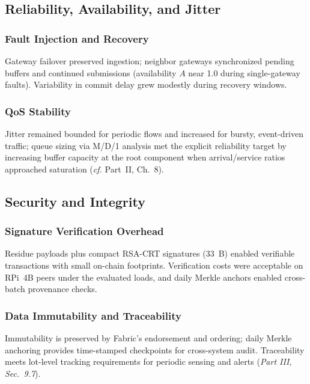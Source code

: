 \subsection{Reliability, Availability, and Jitter}

\subsubsection{Fault Injection and Recovery}
Gateway failover preserved ingestion; neighbor gateways synchronized pending buffers and continued submissions (availability $A$ near 1.0 during single-gateway faults). Variability in commit delay grew modestly during recovery windows. %

\subsubsection{QoS Stability}
Jitter remained bounded for periodic flows and increased for bursty, event-driven traffic; queue sizing via M/D/1 analysis met the explicit reliability target by increasing buffer capacity at the root component when arrival/service ratios approached saturation (\emph{cf.} Part~II, Ch.~8). %

\subsection{Security and Integrity}

\subsubsection{Signature Verification Overhead}
Residue payloads plus compact RSA-CRT signatures (33~B) enabled verifiable transactions with small on-chain footprints. Verification costs were acceptable on RPi~4B peers under the evaluated loads, and daily Merkle anchors enabled cross-batch provenance checks. %

\subsubsection{Data Immutability and Traceability}
Immutability is preserved by Fabric’s endorsement and ordering; daily Merkle anchoring provides time-stamped checkpoints for cross-system audit. Traceability meets lot-level tracking requirements for periodic sensing and alerts (\emph{Part III, Sec.~9.7}). %

